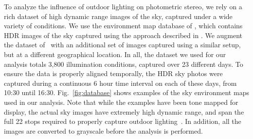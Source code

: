 \documentclass{report}
\begin{document}
To analyze the influence of outdoor lighting on photometric stereo, we rely on a rich dataset of high dynamic range images of the sky, captured under a wide variety of conditions. We use the environment map database of \cite{lalonde-3dv-14}, which contains HDR images of the sky captured using the approach described in \cite{stumpfel-afrigraph-04}. We augment the dataset of~\cite{lalonde-3dv-14} with an additional set of images captured using a similar setup, but at a different geographical location. In all, the dataset we used for our analysis totals 3,800 illumination conditions, captured over 23 different days. To ensure the data is properly aligned temporally, the HDR sky photos were captured during a continuous 6 hour time interval on each of these days, from 10:30 until 16:30. Fig.~\ref{fig:database} shows examples of the sky environment maps used in our analysis. Note that while the examples have been tone mapped for display, the actual sky images have extremely high dynamic range, and span the full 22 stops required to properly capture outdoor lighting~\cite{stumpfel-afrigraph-04}. In addition, all the images are converted to grayscale before the analysis is performed.
\end{document}
